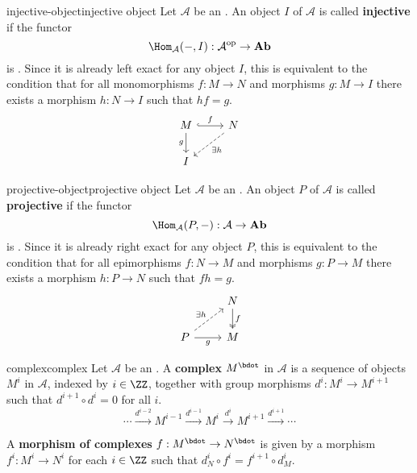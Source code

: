 \begin{topic}{injective-object}{injective object}
    Let $\mathcal{A}$ be an . An object $I$ of $\mathcal{A}$ is called \textbf{injective} if the functor
    \[ \Hom_\mathcal{A}(-, I) : \mathcal{A}^\text{op} \to \textbf{Ab} \]
    is . Since it is already left exact for any object $I$, this is equivalent to the condition that for all monomorphisms $f : M \to N$ and morphisms $g : M \to I$ there exists a morphism $h : N \to I$ such that $hf = g$.
    \[ \begin{tikzcd} M \arrow[hookrightarrow]{r}{f} \arrow[swap]{d}{g} & N \arrow[dashed]{ld}{\exists h} \\ I & \end{tikzcd} \]
\end{topic}

\begin{topic}{projective-object}{projective object}
    Let $\mathcal{A}$ be an . An object $P$ of $\mathcal{A}$ is called \textbf{projective} if the functor
    \[ \Hom_\mathcal{A}(P, -) : \mathcal{A} \to \textbf{Ab} \]
    is . Since it is already right exact for any object $P$, this is equivalent to the condition that for all epimorphisms $f : N \to M$ and morphisms $g : P \to M$ there exists a morphism $h : P \to N$ such that $fh = g$.
    \[ \begin{tikzcd} & N \arrow[twoheadrightarrow]{d}{f} \\ P \arrow[swap]{r}{g} \arrow[dashed]{ur}{\exists h} & M \end{tikzcd} \]
\end{topic}

\begin{topic}{complex}{complex}
    Let $\mathcal{A}$ be an . A \textbf{complex} $M^\bdot$ in $\mathcal{A}$ is a sequence of objects $M^i$ in $\mathcal{A}$, indexed by $i \in \ZZ$, together with group morphisms $d^i : M^i \to M^{i + 1}$ such that $d^{i + 1} \circ d^i = 0$ for all $i$.
    \[ \cdots \xrightarrow{d^{i - 2}} M^{i - 1} \xrightarrow{d^{i - 1}} M^i \xrightarrow{d^i} M^{i + 1} \xrightarrow{d^{i + 1}} \cdots \]
    
    A \textbf{morphism of complexes} $f : M^\bdot \to N^\bdot$ is given by a morphism $f^i : M^i \to N^i$ for each $i \in \ZZ$ such that $d_N^i \circ f^i = f^{i + 1} \circ d_M^i$.
\end{topic}

